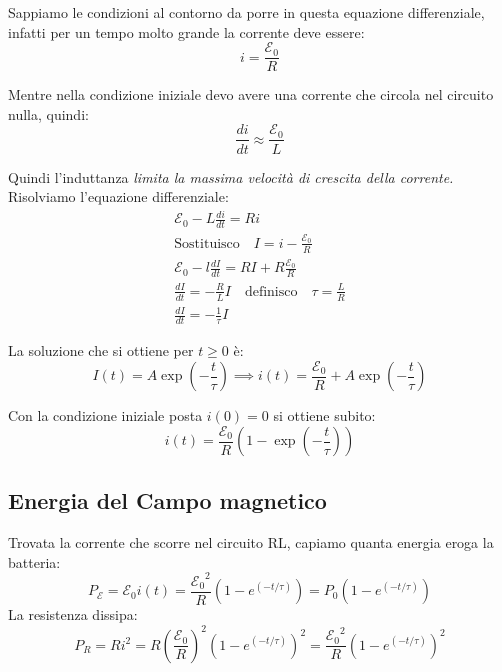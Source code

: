 \documentclass[a4paper]{scrarticle}
\begin{document}
Sappiamo le condizioni al contorno da porre in questa equazione differenziale, infatti per un tempo molto grande la corrente deve essere:
\begin{equation*}
    i = \frac{\mathcal{E_0}}{R}
\end{equation*}

Mentre nella condizione iniziale devo avere una corrente che circola nel circuito nulla, quindi:
\begin{equation*}
    \frac{di}{dt} \approx \frac{\mathcal{E_0}}{L}
\end{equation*}

Quindi l'induttanza \emph{limita la massima velocità di crescita della corrente.}
Risolviamo l'equazione differenziale:
\begin{gather*}
    \mathcal{E_0} - L \frac{di}{dt} = Ri\\
    \text{Sostituisco}\quad I = i - \frac{\mathcal{E_0}}{R}\\
    \mathcal{E_0} - l \frac{dI}{dt} = RI + R \frac{\mathcal{E_0}}{R}\\
    \frac{dI}{dt} = - \frac{R}{L}I \quad \text{definisco} \quad \tau = \frac{L}{R}\\
    \frac{dI}{dt} = - \frac{1}{\tau} I
\end{gather*}

La soluzione che si ottiene per $t\ge 0$ è:
\begin{equation*}
    I(t) = A \exp\left(-\frac{t}{\tau}\right) \implies i(t) = \frac{\mathcal{E_0}}{R} + A \exp\left(-\frac{t}{\tau}\right)
\end{equation*}

Con la condizione iniziale posta $i(0) = 0$ si ottiene subito:
\begin{equation*}
    i(t) = \frac{\mathcal{E_0}}{R} \left(1 - \exp\left(-\frac{t}{\tau}\right)\right)
\end{equation*}

\subsection{Energia del Campo magnetico}

Trovata la corrente che scorre nel circuito RL, capiamo quanta energia eroga la batteria:
\begin{equation*}
    P_\mathcal{E} = \mathcal{E_0} i(t) = \frac{\mathcal{E_0}^2}{R} \left(1 - e^{(-t/\tau)}\right) = P_0 \left(1 - e^{(-t/\tau)}\right)
\end{equation*}
La resistenza dissipa:
\begin{equation*}
    P_R = Ri^2 = R \left(\frac{\mathcal{E_0}}{R}\right)^2 \left(1 - e^{(-t/\tau)}\right)^2 = \frac{\mathcal{E_0}^2}{R}\left(1 - e^{(-t/\tau)}\right)^2  
\end{equation*}
\end{document}
